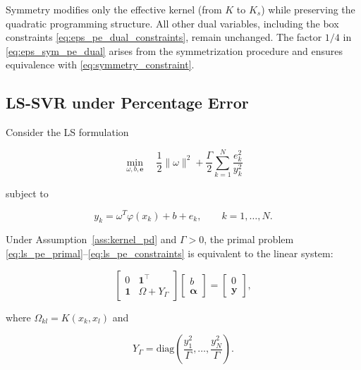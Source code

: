 \documentclass[mathematics,article,submit,pdftex,moreauthors]{Definitions/mdpi}
\begin{document}
\begin{Remark}\label{rem:eps_sym_mechanism}
Symmetry modifies only the effective kernel (from $K$ to $K_s$) while preserving the quadratic programming structure. 
All other dual variables, including the box constraints \eqref{eq:eps_pe_dual_constraints}, remain unchanged. 
The factor $1/4$ in \eqref{eq:eps_sym_pe_dual} arises from the symmetrization procedure and ensures equivalence with \eqref{eq:symmetry_constraint}.
\end{Remark}


\subsection{LS-SVR under Percentage Error}\label{subsec:ls_pe}

Consider the LS formulation
\begin{linenomath}
\begin{equation}\label{eq:ls_pe_primal}
\min_{\omega,b,\mathbf{e}}
\quad
\frac{1}{2}\|\omega\|^2
+
\frac{\Gamma}{2}\sum_{k=1}^N\frac{e_k^2}{y_k^2}
\end{equation}
\end{linenomath}
subject to
\begin{linenomath}
\begin{equation}\label{eq:ls_pe_constraints}
y_k=\omega^T\varphi(x_k) + b + e_k,\qquad k=1,\dots,N.
\end{equation}
\end{linenomath}

\begin{Theorem}\label{thm:ls_rmspe_system}
Under Assumption~\ref{ass:kernel_pd} and $\Gamma > 0$, the primal problem \eqref{eq:ls_pe_primal}--\eqref{eq:ls_pe_constraints} 
is equivalent to the linear system:
\begin{linenomath}
\begin{equation}\label{eq:ls_pe_system}
\begin{bmatrix}
0 & \mathbf{1}^\top\\
\mathbf{1} & \Omega + Y_\Gamma
\end{bmatrix}
\begin{bmatrix}
b\\
\boldsymbol{\alpha}
\end{bmatrix}
=
\begin{bmatrix}
0\\
\mathbf{y}
\end{bmatrix},
\end{equation}
\end{linenomath}
where $\Omega_{kl}=K(x_k,x_l)$ and
\begin{linenomath}
\begin{equation}\label{eq:YGamma_def}
Y_\Gamma=\mathrm{diag}\!\left(\frac{y_1^2}{\Gamma},\dots,\frac{y_N^2}{\Gamma}\right).
\end{equation}
\end{linenomath}
\end{Theorem}
\end{document}
